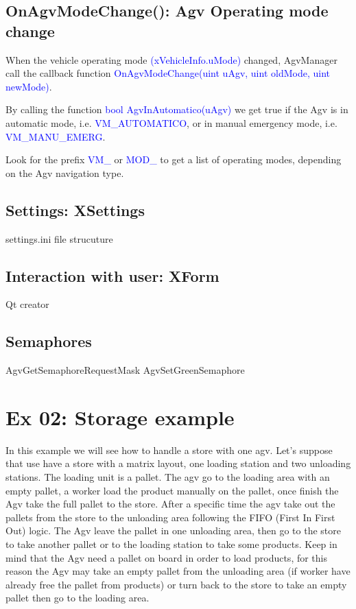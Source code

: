 %
\subsection{OnAgvModeChange(): Agv Operating mode change}
When the vehicle operating mode \textcolor{blue}{(xVehicleInfo.uMode)} changed, AgvManager call the callback function \textcolor{blue}{OnAgvModeChange(uint uAgv, uint oldMode, uint newMode)}.

By calling the function \textcolor{blue}{bool AgvInAutomatico(uAgv)} we get true if the Agv is in automatic mode, i.e. \textcolor{blue}{VM\_AUTOMATICO}, or in manual emergency mode, i.e. \textcolor{blue}{VM\_MANU\_EMERG}.

Look for the prefix \textcolor{blue}{VM\_} or \textcolor{blue}{MOD\_} to get a list of operating modes, depending on the Agv navigation type.

%
\subsection{Settings: XSettings}

settings.ini file strucuture

%
\subsection{Interaction with user: XForm}
Qt creator

%
\subsection{Semaphores}
AgvGetSemaphoreRequestMask
AgvSetGreenSemaphore



\section{Ex 02: Storage example}
In this example we will see how to handle a store with one agv. Let's suppose that use have a store with a matrix layout, one loading station and two unloading stations.
The loading unit is a pallet. The agv go to the loading area with an empty pallet, a worker load the product manually on the pallet, once finish the Agv take the full pallet to the store. After a specific time the agv take out the pallets from the store to the unloading area following the FIFO (First In First Out) logic. The Agv leave the pallet in one unloading area, then go to the store to take another pallet or to the loading station to take some products. Keep in mind that the Agv need a pallet on board in order to load products, for this reason the Agv may take an empty pallet from the unloading area (if worker have already free the pallet from products) or turn back to the store to take an empty pallet then go to the loading area.

